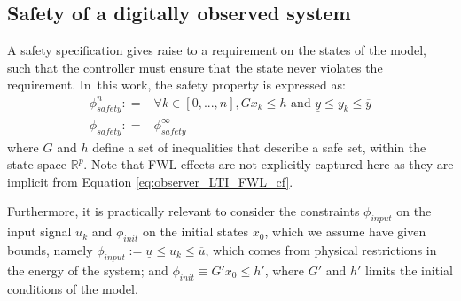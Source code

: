 \documentclass[sigconf]{llncs}
\newcommand{\mat}[1]{{#1}}
\renewcommand{\vec}[1]{{#1}}
\begin{document}
\subsection{Safety of a digitally observed system}\label{sec:cof_safety}
A safety specification gives raise to a requirement on the
states of the model, such that the controller
must ensure that the state never violates the
requirement.
In~this work, the safety property is expressed as:
%
\begin{align}
\phi_\mathit{safety}^n: = & \forall k \in [0, ... , n], \mat{G}\vec{x}_k \leq \vec{h} \text{ and } \underline{y} \leq y_k \leq \overline{y}\nonumber\\
\phi_\mathit{safety}: = & \phi_\mathit{safety}^\infty
\label{eq:safetyspec}
\end{align}
%
where $\mat{G}$ and $\vec{h}$ define a set of inequalities that describe 
a safe set, within the state-space $\mathbb{R}^p$.
%
Note that FWL effects are not explicitly captured here
as they are implicit from Equation \ref{eq:observer_LTI_FWL_cf}.

Furthermore, it is practically relevant to consider the 
constraints $\phi_\mathit{input}$ on the input
signal $u_{k}$ and $\phi_\mathit{init}$ on the initial states $x_0$,
which we assume have given bounds, namely 
$\phi_\mathit{input} := \underline{u} \leq u_k \leq \overline{u}$, 
which comes from physical restrictions in the energy of the system; and
$\phi_\mathit{init}\equiv \mat{G}' \vec{x}_0 \leq \vec{h}'$,
where $\mat{G}'$ and $\vec{h}'$ limits the initial conditions of the model. 

%
%
\end{document}
